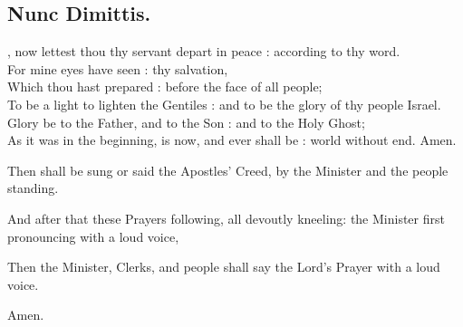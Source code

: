 \subsection{Nunc Dimittis.}

, now lettest thou thy servant depart in peace : according to thy word.\\
For mine eyes have seen : thy salvation,\\
Which thou hast prepared : before the face of all people;\\
To be a light to lighten the Gentiles : and to be the glory of thy people Israel.\\
Glory be to the Father, and to the Son : and to the Holy Ghost;\\
As it was in the beginning, is now, and ever shall be : world without end. Amen.

\begin{rubric}
Then shall be sung or said the Apostles' Creed, by the Minister and the people standing.
\end{rubric}



\begin{rubric}
And after that these Prayers following, all devoutly kneeling: the Minister first pronouncing with a loud voice,
\end{rubric}




\newpage

\begin{rubric}
Then the Minister, Clerks, and people shall say the Lord's Prayer with a loud voice.
\end{rubric}


Amen.


